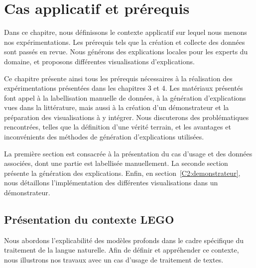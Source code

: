 \chapter[Cas applicatif et prérequis]{Cas applicatif et prérequis} \label{C2}


Dans ce chapitre, nous définissons le contexte applicatif sur lequel nous menons nos expérimentations. Les prérequis tels que la création et collecte des données sont passés en revue. Nous générons des explications locales pour les experts du domaine, et proposons différentes visualisations d'explications.

Ce chapitre présente ainsi tous les prérequis nécessaires à la réalisation des expérimentations présentées dans les chapitres 3 et 4. Les matériaux présentés font appel à la labellisation manuelle de données, à la génération d'explications vues dans la littérature, mais aussi à la création d'un démonstrateur et la préparation des visualisations à y intégrer.
Nous discuterons des problématiques rencontrées, telles que la définition d'une vérité terrain, et les avantages et inconvénients des méthodes de génération d'explications utilisées.

La première section est consacrée à la présentation du cas d'usage et des données associées, dont une partie est labellisée manuellement. La seconde section présente la génération des explications. Enfin, en section~\ref{C2:demonstrateur}, nous détaillons l'implémentation des différentes visualisations dans un démonstrateur.

\section{Présentation du contexte LEGO} \label{C2:usecase}

Nous abordons l'explicabilité des modèles profonds dans le cadre spécifique du traitement de la langue naturelle. Afin de définir et appréhender ce contexte, nous illustrons nos travaux avec un cas d'usage de traitement de textes.

